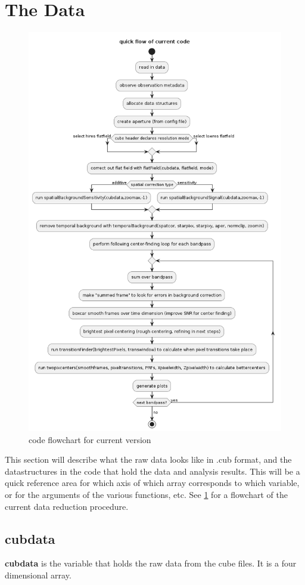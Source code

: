 \documentclass[12pt]{article}
\begin{document}
\section{The Data}

\begin{figure}[h!]
  \includegraphics[width=0.7\linewidth]{codeflow.png}
  \caption{code flowchart for current version}
  \label{fig:flowchart}
\end{figure}

This section will describe what the raw data looks like in .cub format, and the
datastructures in the code that hold the data and analysis results. This will
be a quick reference area for which axis of which array corresponds to which
variable, or for the arguments of the various functions, etc. See
\ref{fig:flowchart} for a flowchart of the current data reduction procedure.

\subsection{cubdata}

{\bf cubdata} is the variable that holds the raw data from the cube files. It
is a four dimensional array.\\
\end{document}

